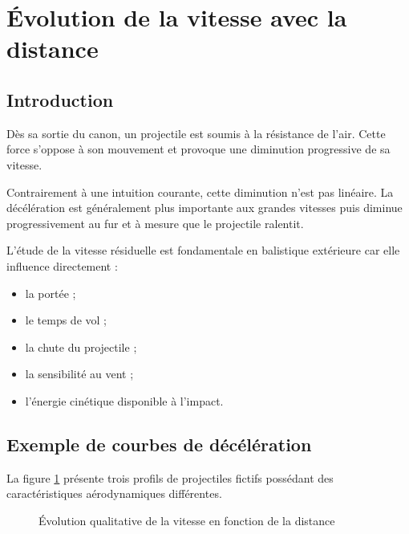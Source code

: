 \section{Évolution de la vitesse avec la distance}

\subsection{Introduction}

Dès sa sortie du canon, un projectile est soumis à la résistance de l'air. Cette force s'oppose à son mouvement et provoque une diminution progressive de sa vitesse.

Contrairement à une intuition courante, cette diminution n'est pas linéaire. La décélération est généralement plus importante aux grandes vitesses puis diminue progressivement au fur et à mesure que le projectile ralentit.

L'étude de la vitesse résiduelle est fondamentale en balistique extérieure car elle influence directement :

\begin{itemize}
\item la portée ;
\item le temps de vol ;
\item la chute du projectile ;
\item la sensibilité au vent ;
\item l'énergie cinétique disponible à l'impact.
\end{itemize}

\subsection{Exemple de courbes de décélération}

La figure \ref{fig:vitesse_distance} présente trois profils de projectiles fictifs possédant des caractéristiques aérodynamiques différentes.

\begin{figure}[H]
\centering
{}

\caption{Évolution qualitative de la vitesse en fonction de la distance}
\label{fig:vitesse_distance}

\end{figure}

